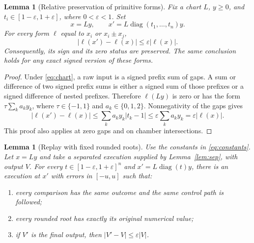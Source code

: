\documentclass[11pt,a4paper]{article}
\newtheorem{lemma}[theorem]{Lemma}
\theoremstyle{definition}
\theoremstyle{remark}
\newcommand{\abs}[1]{\lvert #1\rvert}
\newcommand{\diag}{\operatorname{diag}}
\begin{document}
\begin{lemma}[Relative preservation of primitive forms]\label{lem:primitive}
Fix a chart $L$, $y\ge0$, and $t_i\in[1-\varepsilon,1+\varepsilon]$, where
$0<\varepsilon<1$. Set
\[
 x=Ly,\qquad x'=L\diag(t_1,\ldots,t_n)y.
\]
For every form $\ell$ equal to $x_i$ or $x_i\pm x_j$,
\begin{equation}\label{eq:primitive}
 \abs{\ell(x')-\ell(x)}\le\varepsilon\abs{\ell(x)}.
\end{equation}
Consequently, its sign and its zero status are preserved. The same conclusion
holds for any exact signed version of these forms.
\end{lemma}

\begin{proof}
Under \eqref{eq:chart}, a raw input is a signed prefix sum of gaps. A sum or
difference of two signed prefix sums is either a signed sum of those prefixes
or a signed difference of nested prefixes. Therefore $\ell(Ly)$ is zero or
has the form $\tau\sum_k a_ky_k$, where $\tau\in\{-1,1\}$ and
$a_k\in\{0,1,2\}$. Nonnegativity of the gaps gives
\[
 \abs{\ell(x')-\ell(x)}
 \le\sum_k a_ky_k\abs{t_k-1}
 \le\varepsilon\sum_k a_ky_k
 =\varepsilon\abs{\ell(x)}.
\]
This proof also applies at zero gaps and on chamber intersections.
\end{proof}

\begin{lemma}[Replay with fixed rounded roots]\label{lem:replay}
Use the constants in \eqref{eq:constants}. Let $x=Ly$ and take a separated
execution supplied by Lemma~\ref{lem:sep}, with output $V$. For every
$t\in[1-\varepsilon,1+\varepsilon]^n$ and
$x'=L\diag(t)y$, there is an execution at $x'$ with errors in $[-u,u]$ such that:
\begin{enumerate}[label=\textnormal{(\alph*)}]
\item every comparison has the same outcome and the same control path is followed;
\item every rounded root has exactly its original numerical value;
\item if $V'$ is the final output, then $\abs{V'-V}\le\varepsilon\abs V$.
\end{enumerate}
\end{lemma}
\end{document}
